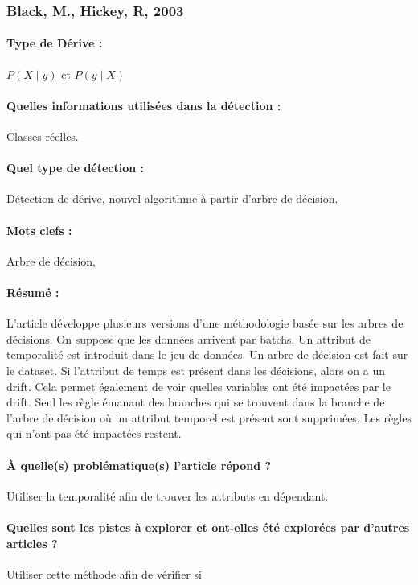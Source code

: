 \documentclass[11pt,a4paper]{report}
\begin{document}
\subsubsection{Black, M., Hickey, R, 2003}

\paragraph{Type de Dérive :} $P(X\mid y)$ et $P(y \mid X)$
\paragraph{Quelles informations utilisées dans la détection :} Classes réelles.
\paragraph{Quel type de détection :} Détection de dérive, nouvel algorithme à partir d'arbre de décision.

\paragraph{Mots clefs :} Arbre de décision, 

\paragraph{Résumé :} L'article développe plusieurs versions d'une méthodologie basée sur les arbres de décisions.  On suppose que les données arrivent par batchs. Un attribut de temporalité est introduit dans le jeu de données. Un arbre de décision est fait sur le dataset. Si l’attribut de temps est présent dans les décisions, alors on a un drift. Cela permet également de voir quelles variables ont été impactées par le drift. Seul les règle émanant des branches qui se trouvent dans la branche de l’arbre de décision où un attribut temporel est présent sont supprimées. Les règles qui n’ont pas été impactées restent.

\paragraph{À quelle(s) problématique(s) l'article répond ?} Utiliser la temporalité afin de trouver les attributs en dépendant.

\paragraph{Quelles sont les pistes à explorer et ont-elles  été explorées par d'autres articles ?} Utiliser cette méthode afin de vérifier si 
\end{document}
